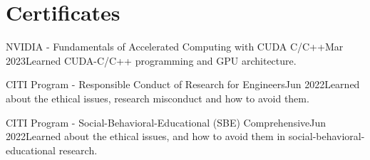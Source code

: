 \section{Certificates}
\resumeSubHeadingListStart

\resumeOrganizationHeading
{NVIDIA - Fundamentals of Accelerated Computing with CUDA C/C++}{Mar 2023}{Learned CUDA-C/C++ programming and GPU architecture.}

\resumeOrganizationHeading
{CITI Program - Responsible Conduct of Research for Engineers}{Jun 2022}{Learned about the ethical issues, research misconduct and how to avoid them.}

\resumeOrganizationHeading
{CITI Program - Social-Behavioral-Educational (SBE) Comprehensive}{Jun 2022}{Learned about the ethical issues, and how to avoid them in social-behavioral-educational research.}

\resumeSubHeadingListEnd